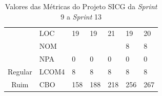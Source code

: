 \begin{table}[H]
\begin{tabular}{|c|l|l|l|l|l|l|}
                                                   & LOC              & 19                & 19                 & 21                 & 19                 & 20                 \\ \cline{2-7} 
                                                   & NOM              &                   &                    &                    & 8                  & 8                  \\ \cline{2-7} 
                                                   & NPA              & 0                 & 0                  & 0                  & 0                  & 0                  \\ \hline
Regular                                            & LCOM4            & 8                 & 8                  & 8                  & 8                  & 8                  \\ \hline
Ruim                                               & CBO              & 158               & 188                & 218                & 256                & 267                \\ \hline
\end{tabular}
\caption{Valores das Métricas do Projeto SICG da \textit{Sprint} 9 a \textit{Sprint} 13}
		\label{metricasprint2}
\end{table}

